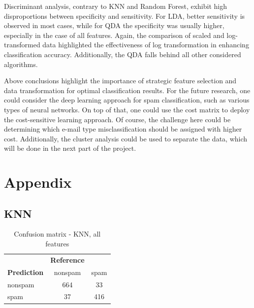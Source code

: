 \documentclass{article}\usepackage[]{graphicx}\usepackage[]{xcolor}
\begin{document}
Discriminant analysis, contrary to KNN and Random Forest, exhibit high disproportions 
between specificity and sensitivity. For LDA, better sensitivity is observed in 
most cases, while for QDA the specificity was usually higher, especially in the 
case of all features. Again, the comparison of scaled and log-transformed data 
highlighted the effectiveness of log transformation in enhancing classification accuracy.
Additionally, the QDA falls behind all other considered algorithms.

Above conclusions highlight the importance of strategic feature selection and data 
transformation for optimal classification results. For the future research, one
could consider the deep learning approach for spam classification, such as various
types of neural networks. On top of that, one could use the cost matrix to deploy
the cost-sensitive learning approach. Of course, the challenge here could be 
determining which e-mail type misclassification should be assigned with higher cost.
Additionally, the cluster analysis could be used to separate the data, which
will be done in the next part of the project.

\section{Appendix}
\label{sec:appendix}
\subsection*{KNN}
\begin{table}[h]
    \centering
    \begin{tabular}{lcc}
        & \textbf{Reference} & \\
        \textbf{Prediction} & nonspam & spam \\
        nonspam & 664 & 33 \\
        spam & 37 & 416 \\
    \end{tabular}
    \caption{Confusion matrix - KNN, all features}
    \label{KNNcm1}
\end{table}
\end{document}
